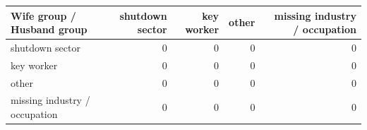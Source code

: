 
\begin{tabular}{lrrrr}
\toprule
Wife group / Husband group & shutdown sector & key worker & other & missing industry / occupation\\
\midrule
shutdown sector & 0 & 0 & 0 & 0\\
key worker & 0 & 0 & 0 & 0\\
other & 0 & 0 & 0 & 0\\
missing industry / occupation & 0 & 0 & 0 & 0\\
\bottomrule
\end{tabular}

